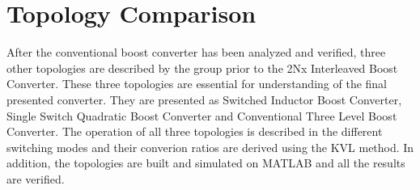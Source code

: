 \section{Topology Comparison}\label{ch:CBC}

After the conventional boost converter has been analyzed and verified,
three other topologies are described by the group prior to the 2Nx Interleaved Boost Converter. These three topologies are essential for understanding of the final presented converter. They are presented as Switched Inductor Boost Converter, Single Switch Quadratic Boost Converter and Conventional Three Level Boost Converter. The operation of all three topologies is described in the different switching modes and their converion ratios are derived using the KVL method. In addition, the topologies are built and simulated on MATLAB and all the results are verified.

